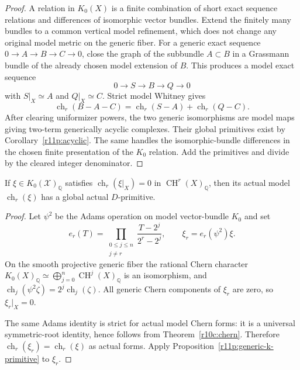 \begin{proof}
A relation in $K_0(X)$ is a finite combination of short exact sequence
relations and differences of isomorphic vector bundles.  Extend the
finitely many bundles to a common vertical model refinement, which
does not change any original model metric on the generic fiber.
For a generic exact sequence $0\to A\to B\to C\to0$, close the graph
of the subbundle $A\subset B$ in a Grassmann bundle of the already
chosen model extension of $B$.  This produces a model exact sequence
\[
                         0\to S\to B\to Q\to0
\]
with $S|_X\simeq A$ and $Q|_X\simeq C$.  Strict model Whitney gives
\[
      \operatorname{ch}_r(B-A-C)
       =\operatorname{ch}_r(S-A)+\operatorname{ch}_r(Q-C).
\]
After clearing uniformizer powers, the two generic isomorphisms are
model maps giving two-term generically acyclic complexes.  Their
global primitives exist by Corollary~\ref{r11p:acyclic}.
The same handles the isomorphic-bundle differences in the chosen
finite presentation of the $K_0$ relation.  Add the primitives and
divide by the cleared integer denominator.
\end{proof}

\begin{proposition}
\label{r11p:generic-chow-primitive}
If $\xi\in K_0(\mathcal X)_{\mathbb Q}$ satisfies
$\operatorname{ch}_r(\xi|_X)=0$ in
$\operatorname{CH}^r(X)_{\mathbb Q}$, then its actual model
$\operatorname{ch}_r(\xi)$ has a global actual $D$-primitive.
\end{proposition}

\begin{proof}
Let $\psi^2$ be the Adams operation on model vector-bundle $K_0$ and set
\[
 e_r(T)=\prod_{\substack{0\leq j\leq n\\j\ne r}}
                  \frac{T-2^j}{2^r-2^j},
 \qquad
                            \xi_r=e_r(\psi^2)\xi.
\]
On the smooth projective generic fiber the rational Chern character
$K_0(X)_{\mathbb Q}\simeq\bigoplus_{j=0}^n
\operatorname{CH}^j(X)_{\mathbb Q}$ is an isomorphism, and
$\operatorname{ch}_j(\psi^2\zeta)=2^j\operatorname{ch}_j(\zeta)$.
All generic Chern components of $\xi_r$ are zero, so $\xi_r|_X=0$.

The same Adams identity is strict for actual model Chern forms:
it is a universal symmetric-root identity, hence follows from
Theorem~\ref{r10c:chern}.
Therefore $\operatorname{ch}_r(\xi_r)=\operatorname{ch}_r(\xi)$
as actual forms.  Apply Proposition~\ref{r11p:generic-k-primitive}
to $\xi_r$.
\end{proof}

